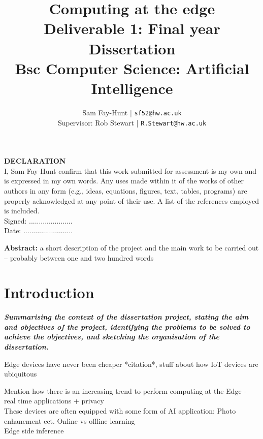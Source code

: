 \documentclass[11pt]{article}
\begin{document}
\title{%
	\bf Computing at the edge\\ 
	\large Deliverable 1: Final year Dissertation \\
	Bsc Computer Science: Artificial Intelligence}

\author{
	Sam Fay-Hunt | \texttt{sf52@hw.ac.uk}\\
	Supervisor: Rob Stewart | \texttt{R.Stewart@hw.ac.uk}
}

\maketitle

\pagebreak

\textbf{DECLARATION}\\
I, Sam Fay-Hunt confirm that this work submitted for assessment is my own and is expressed in
my own words. Any uses made within it of the works of other authors in any form (e.g., ideas,
equations, figures, text, tables, programs) are properly acknowledged at any point of their
use. A list of the references employed is included.\\
Signed: ......................\\
Date: .........................

\pagebreak

\textbf{Abstract:} a short description of the project and the main work to be carried out – probably
between one and two hundred words
\pagebreak

\tableofcontents
\thispagestyle{empty}
\pagebreak


\setcounter{page}{1}

\section{Introduction}
\emph{\textbf{Summarising the context of the dissertation project, stating the aim and objectives of the project, identifying the problems to be solved to achieve the objectives, and sketching
the organisation of the dissertation.}}

Edge devices have never been cheaper *citation*, stuff about how IoT devices are ubiquitous

Mention how there is an increasing trend to perform computing at the Edge - real time applications + privacy\\
These devices are often equipped with some form of AI application: Photo enhancment ect. Online vs offline learning\\
Edge side inference
\end{document}
